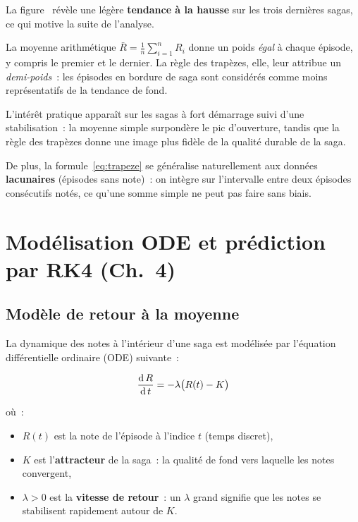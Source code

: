 \documentclass[a4paper,12pt,french]{article}
\begin{document}
\newpage
La figure~ révèle une légère \textbf{tendance à la hausse} sur les trois dernières sagas, ce qui motive la suite de l'analyse.

\begin{tcolorbox}[justif, title={Pourquoi les trapèzes et non la moyenne simple~?}]
La moyenne arithmétique $\bar{R} = \frac{1}{n}\sum_{i=1}^{n} R_i$ donne un poids
\textit{égal} à chaque épisode, y compris le premier et le dernier.
La règle des trapèzes, elle, leur attribue un \textit{demi-poids}~: les épisodes
en bordure de saga sont considérés comme moins représentatifs de la tendance de fond.

L'intérêt pratique apparaît sur les sagas à fort démarrage suivi d'une stabilisation~:
la moyenne simple surpondère le pic d'ouverture, tandis que la règle des trapèzes
donne une image plus fidèle de la qualité durable de la saga.

De plus, la formule~\eqref{eq:trapeze} se généralise naturellement aux données
\textbf{lacunaires} (épisodes sans note)~: on intègre sur l'intervalle entre deux
épisodes consécutifs notés, ce qu'une somme simple ne peut pas faire sans biais.
\end{tcolorbox}

\newpage
\section{Modélisation ODE et prédiction par RK4 (Ch.~4)}

\subsection{Modèle de retour à la moyenne}

La dynamique des notes à l'intérieur d'une saga est modélisée par l'équation différentielle ordinaire (ODE) suivante~:

\begin{equation}
  \dfrac{\mathrm{d}\, R}{\mathrm{d}\, t} = -\lambda \bigl(R(t) - K\bigr)
  \label{eq:ode}
\end{equation}

où~:
\begin{itemize}
  \item $R(t)$ est la note de l'épisode à l'indice $t$ (temps discret),
  \item $K$ est l'\textbf{attracteur} de la saga~: la qualité de fond vers
        laquelle les notes convergent,
  \item $\lambda > 0$ est la \textbf{vitesse de retour}~: un $\lambda$ grand signifie que les notes se stabilisent rapidement autour de $K$.
\end{itemize}
\end{document}
